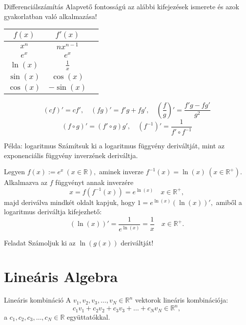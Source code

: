 \documentclass[10pt]{beamer}
\newcommand{\R}[0]{\mathbb{R}}
\begin{document}
\begin{frame}[t]{Differenciálszámítás}
Alapvető fontosságú az alábbi kifejezések ismerete és azok gyakorlatban való alkalmazása!
\begin{table}
\centering
\begin{tabular}{ccc}
\toprule
$f(x)$ & $f'(x)$ \\
\midrule
$x^n$ & $n x^{n-1}$\\
$e^x$ & $e^x$\\
$\ln(x)$ & $\frac{1}{x}$\\
$\sin(x)$ & $\cos(x)$\\
$\cos(x)$ & $-\sin(x)$\\
\bottomrule
\end{tabular}
\end{table}

\[(cf)' = cf', \quad (fg)' = f'g + fg', \quad \left(\frac{f}{g}\right)' = \frac{f'g - fg'}{g^2}\]
\[(f\circ g)' = (f'\circ g) g', \quad \left(f^{-1}\right)' = \frac{1}{f'\circ f^{-1}}\]
\end{frame}

\begin{frame}[t]{Példa: logaritmus}
Számítsuk ki a logaritmus függvény deriváltját, mint az exponenciális függvény inverzének deriváltja.

Legyen $f(x):=e^x\ (x\in\R),$ aminek inverze $f^{-1}(x) = \ln(x)\ (x\in\R^+).$
Alkalmazva az $f$ függvényt annak inverzére
\[x = f(f^{-1}(x)) = e^{\ln(x)} \quad x\in\R^+,\]
majd deriválva mindkét oldalt kapjuk, hogy $1 = e^{\ln(x)} (\ln(x))',$ 
amiből a logaritmus deriváltja kifejezhető:
\[(\ln(x))' = \frac{1}{e^{\ln(x)}} = \frac{1}{x}  \quad x\in\R^+.\]
\begin{exampleblock}{Feladat}
Számoljuk ki az $\ln(g(x))$ deriváltját!
\end{exampleblock}
\end{frame}



\section{Lineáris Algebra}
\begin{frame}[t]{Lineáris kombináció}
A $v_1, v_2, v_3, \dots,v_N \in \R^n$ vektorok lineáris kombinációja:
\[c_1 v_1 + c_2 v_2 + c_3 v_3 + \dots + c_N v_N \in \R^n,\]
a $c_1, c_2, c_3,\dots, c_N\in\R$ együttatókkal.

\end{frame}
\end{document}
